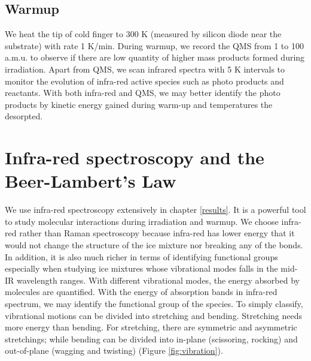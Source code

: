 \subsection{Warmup}
We heat the tip of cold finger to 300 K (measured by silicon diode near the substrate) with rate 1 K/min. During warmup, we record the QMS from 1 to 100 a.m.u. to observe if there are low quantity of higher mass products formed during irradiation. Apart from QMS, we scan infrared spectra with 5 K intervals to monitor the evolution of infra-red active species such as photo products and reactants. With both infra-red and QMS, we may better identify the photo products by kinetic energy gained during warm-up and temperatures the desorpted.

\section{Infra-red spectroscopy and the Beer-Lambert’s Law}
\label{sec:spectroscopy}
We use infra-red spectroscopy extensively in chapter \ref{results}. It is a powerful tool to study molecular interactions during irradiation and warmup. We choose infra-red rather than Raman spectroscopy because infra-red has lower energy that it would not change the structure of the ice mixture nor breaking any of the bonds. In addition, it is also much richer in terms of identifying functional groups especially when studying ice mixtures whose vibrational modes falls in the mid-IR wavelength ranges. With different vibrational modes, the energy absorbed by molecules are quantified. With the energy of absorption bands in infra-red spectrum, we may identify the functional group of the species. To simply classify, vibrational motions can be divided into stretching and bending. Stretching needs more energy than bending. For stretching, there are symmetric and asymmetric stretchings; while bending can be divided into in-plane (scissoring, rocking) and out-of-plane (wagging and twisting) (Figure \ref{fig:vibration}).
